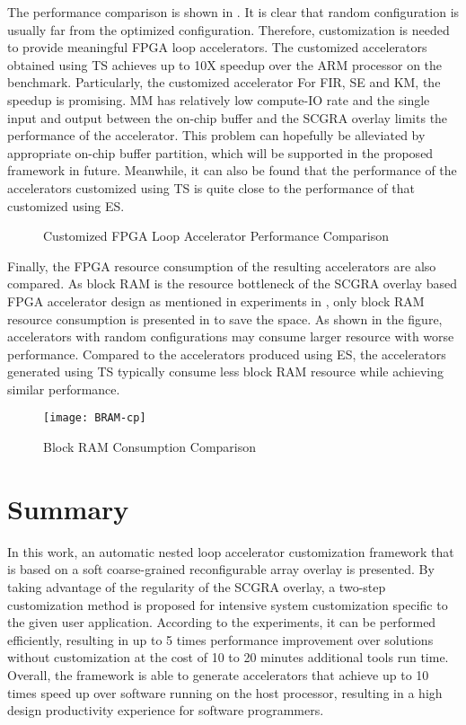 The performance comparison is shown in . It is clear that random configuration is usually far from the optimized configuration. Therefore, customization is needed to provide meaningful FPGA loop accelerators. The customized accelerators obtained using TS achieves up to 10X speedup over the ARM processor on the benchmark. Particularly, the customized accelerator For FIR, SE and KM, the speedup is promising. MM has relatively low compute-IO rate and the single input and output between the on-chip buffer and the SCGRA overlay limits the performance of the accelerator. This problem can hopefully be alleviated by appropriate on-chip buffer partition, which will be supported in the proposed framework in future. Meanwhile, it can also be found that the performance of the accelerators customized using TS is quite close to the performance of that customized using ES. 

\begin{figure}[htb]
\centering
	\subfigure[MM]{%
		\texttt{[image: mm-cp]}
	}
    \hfill
	\subfigure[SE]{%
		\texttt{[image: se-cp]}
	}
	\subfigure[KM]{%
		\texttt{[image: km-cp]}
	}
    \caption{Customized FPGA Loop Accelerator Performance Comparison}
	\label{fig:DSE}
\end{figure}

Finally, the FPGA resource consumption of the resulting accelerators are also compared. As block RAM is the resource bottleneck of the SCGRA overlay based FPGA accelerator design as mentioned in experiments in , only block RAM resource consumption is presented in  to save the space. As shown in the figure, accelerators with random configurations may consume larger resource with worse performance. Compared to the accelerators produced using ES, the accelerators generated using TS typically consume less block RAM resource while achieving similar performance.

\begin{figure}[htb]
    \centering
    \texttt{[image: BRAM-cp]}
    \caption{Block RAM Consumption Comparison}
    \label{fig:BRAM-cp}
\end{figure}

\section{Summary}
In this work, an automatic nested loop accelerator customization framework that is based on a soft coarse-grained reconfigurable array overlay is presented. By taking advantage of the regularity of the SCGRA overlay, a two-step customization method is proposed for intensive system customization specific to the given user application. According to the experiments, it can be performed efficiently, resulting in up to \num{5} times performance improvement over solutions without customization at the cost of \num{10} to \num{20} minutes additional tools run time. Overall, the framework is able to generate accelerators that achieve up to \num{10} times speed up over software running on the host processor, resulting in a high design productivity experience for software programmers.
